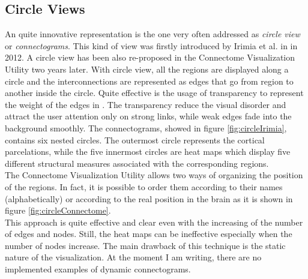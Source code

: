 \documentclass{article}
\begin{document}
\begin{multicols}{2}
\subsection{Circle Views}
\label{subsec:circleviews}
An quite innovative representation is the one very often addressed as \textit{circle view} or \textit{connectograms}. This kind of view was firstly introduced by Irimia et al. in \cite{irimia2012patient} in 2012. A circle view has been also re-proposed in the Connectome Visualization Utility \cite{connectomeVisualizationUtility} two years later.
With circle view, all the regions are displayed along a circle and the interconnections are represented as edges that go from region to another inside the circle. Quite effective is the usage of transparency to represent the weight of the edges in \cite{irimia2012patient}. The transparency reduce the visual disorder and attract the user attention only on strong links, while weak edges fade into the background smoothly. The connectograms, showed in figure \ref{fig:circleIrimia}, contains six nested circles. The outermost circle represents the cortical parcelations, while the five innermost circles are heat maps which display five different structural measures associated with the corresponding regions.\\
The Connectome Visualization Utility allows two ways of organizing the position of the regions. In fact, it is possible to order them according to their names (alphabetically) or according to the real position in the brain as it is shown in figure \ref{fig:circleConnectome}. \\
This approach is quite effective and clear even with the increasing of the number of edges and nodes. Still, the heat maps can be ineffective especially when the number of nodes increase. The main drawback of this technique is the static nature of the visualization. At the moment I am writing, there are no implemented examples of dynamic connectograms.







\end{multicols}
\end{document}

